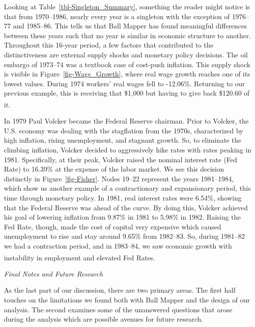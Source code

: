 \documentclass[10pt, letterpaper]{article}
\begin{document}
Looking at Table~\ref{tbl-Singleton_Summary}, something the reader might
notice is that from 1970--1986, nearly every year is a singleton with
the exception of 1976--77 and 1985--86. This tells us that Ball Mapper
has found meaningful differences between these years such that no year
is similar in economic structure to another. Throughout this 16-year
period, a few factors that contributed to the distinctiveness are
external supply shocks and monetary policy decisions. The oil embargo of
1973--74 was a textbook case of cost-push inflation. This supply shock
is visible in Figure~\ref{fig-Wage_Growth}, where real wage growth
reaches one of its lowest values. During 1974 workers' real wages fell
to -12.06\%. Returning to our previous example, this is receiving that
\$1,000 but having to give back \$120.60 of
it.\textsuperscript{}

In 1979 Paul Volcker became the Federal Reserve chairman. Prior to
Volcker, the U.S. economy was dealing with the stagflation from the
1970s, characterized by high inflation, rising unemployment, and
stagnant growth. So, to eliminate the climbing inflation, Volcker
decided to aggressively hike rates with rates peaking in 1981.
Specifically, at their peak, Volcker raised the nominal interest rate
(Fed Rate) to 16.39\% at the expense of the labor market. We see this
decision distinctly in Figure~\ref{fig-Fisher}. Nodes 19--22 represent
the years 1981--1984, which show us another example of a contractionary
and expansionary period, this time through monetary policy. In 1981,
real interest rates were 6.54\%, showing that the Federal Reserve was
ahead of the curve. By doing this, Volcker achieved his goal of lowering
inflation from 9.87\% in 1981 to 5.98\% in 1982. Raising the Fed Rate,
though, made the cost of capital very expensive which caused
unemployment to rise and stay around 9.65\% from 1982--83. So, during
1981--82 we had a contraction period, and in 1983--84, we saw economic
growth with instability in employment and elevated Fed
Rates.\textsuperscript{}

\newpage

\emph{Final Notes and Future Research}

As the last part of our discussion, there are two primary areas. The
first half touches on the limitations we found both with Ball Mapper and
the design of our analysis. The second examines some of the unanswered
questions that arose during the analysis which are possible avenues for
future research.
\end{document}
